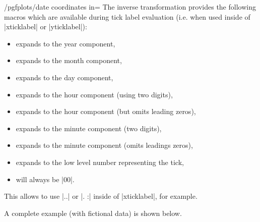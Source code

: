 {\begin{stylekey}{/pgfplots/date coordinates in=}
	The inverse transformation provides the following macros which are available during tick label evaluation (i.e. when used inside of |xticklabel| or |yticklabel|):
	\begin{itemize}
		\item \declareandlabel{\year} expands to the year component,
		\item \declareandlabel{\month} expands to the month component,
		\item \declareandlabel{\day} expands to the day component,
		\item \declareandlabel{\hour} expands to the hour component (using two digits),
		\item \declareandlabel{\Hour} expands to the hour component (but omits leading zeros),
		\item \declareandlabel{\minute} expands to the minute component (two digits),
		\item \declareandlabel{\Minute} expands to the minute component (omits leadings zeros),
		\item \declareandlabel{\lowlevel} expands to the low level number representing the tick,
		\item \declareandlabel{\second} will always be |00|.
	\end{itemize}
	This allows to use |\day.\month.\year| or |\day. \hour:\minute| inside of |xticklabel|, for example.

	A complete example (with fictional data) is shown below.
\begin{codeexample}[]


\end{codeexample}


\end{stylekey}}
